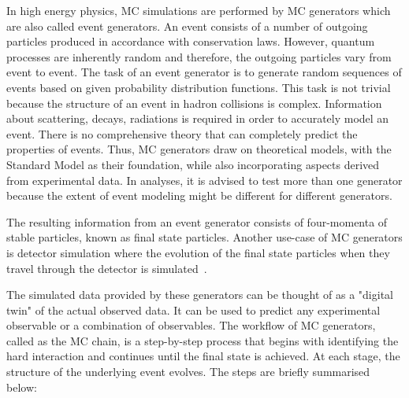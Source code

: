 In high energy physics, MC simulations are performed by MC generators which are also called event
generators. An event consists of a number of outgoing particles produced in accordance with 
conservation laws. However, quantum processes are inherently random and therefore, the outgoing 
particles vary from event to event. The task of an event generator is to generate random sequences 
of events based on given probability distribution functions. This task is not trivial because the 
structure of an event in hadron collisions is complex. Information about scattering, decays, 
radiations is required in order to accurately model an event. 
There is no comprehensive theory that can completely predict the properties of events. Thus, MC 
generators draw on theoretical models, with the Standard Model as their foundation, while also 
incorporating aspects derived from experimental data. In analyses, it is advised to test more 
than one generator because the extent of event modeling might be different for different generators. 

The resulting information from an event generator consists of four-momenta of stable particles, 
known as final state particles. Another use-case of MC generators is detector simulation where 
the evolution of the final state particles when they travel through the detector is simulated~\cite{mcgen}.  

The simulated data provided by these generators can be thought of as a "digital twin"
of the actual observed data. It can be used to predict any experimental observable or a combination of observables.
The workflow of MC generators, called as the MC chain, is a step-by-step process that begins with identifying the hard interaction and 
continues until the final state is achieved. At each stage, the structure of the underlying event 
evolves. The steps are briefly summarised below:

